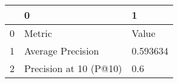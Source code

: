 \begin{tabular}{lll}
\toprule
{} &                       0 &         1 \\
\midrule
0 &                  Metric &     Value \\
1 &       Average Precision &  0.593634 \\
2 &  Precision at 10 (P@10) &       0.6 \\
\bottomrule
\end{tabular}
